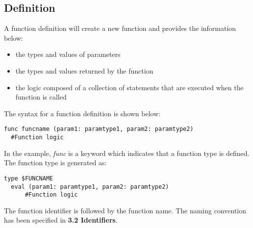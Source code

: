 \documentclass[12pt]{article}
\begin{document}
\subsection{Definition} %
A function definition will create a new function and provides the information below: 
\begin{itemize}
  \item the types and values of parameters
  \item the types and values returned by the function
  \item the logic composed of a collection of statements that are executed when the function is called
\end{itemize}
The syntax for a function definition is shown below:
\begin{lstlisting}[caption=Function Definition]
 func funcname (param1: paramtype1, param2: paramtype2)
  #Function logic
\end{lstlisting}
In the example, \textit{func} is a keyword which indicates that a function type is defined. The function type is generated as:
\begin{lstlisting}[caption=Function Definition]
 type $FUNCNAME
  eval (param1: paramtype1, param2: paramtype2)
      #Function logic
\end{lstlisting}
The function identifier is followed by the function name. The naming convention has been specified in \textbf{3.2 Identifiers}.
\end{document}
